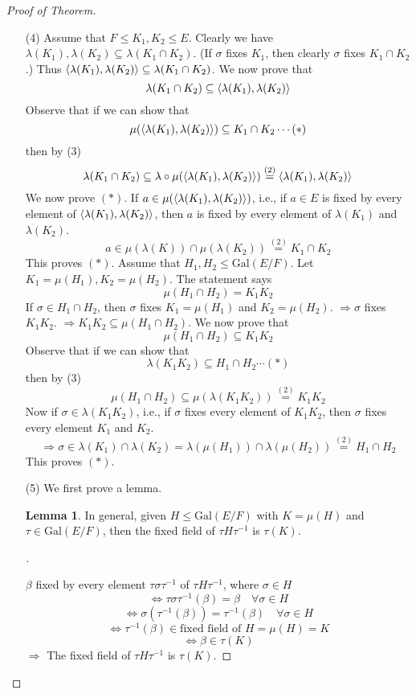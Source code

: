\documentclass{article}
\theoremstyle{definition}
\newtheorem{lem}{Lemma}
\newenvironment{proofs}[1][\proofname]{%
  \begin{proof}[#1]$ $\par\nobreak\ignorespaces
}{%
  \end{proof}
}
\newcommand{\Ra}{\Rightarrow}
\newcommand{\Lra}{\Leftrightarrow}
\begin{document}
\begin{proofs}[Proof of Theorem]
\begin{enumerate}
		\item[(4)] Assume that $F \leq K_1, K_2 \leq E$.
			Clearly we have $\lambda(K_1), \lambda(K_2) \subseteq \lambda(K_1 \cap K_2)$.
			(If $\sigma$ fixes $K_1$, then clearly $\sigma$ fixes $K_1 \cap K_2$.)
			Thus $\ev{\lambda(K_1), \lambda(K_2)} \subseteq \lambda(K_1 \cap K_2)$.
			We now prove that
			\[
				\lambda(K_1 \cap K_2) \subseteq \ev{\lambda(K_1), \lambda(K_2)}
			\]
			Observe that if we can show that
			\[
				\mu(\ev{\lambda(K_1), \lambda(K_2)}) \subseteq K_1 \cap K_2 \cdots (*)
			\]
			then by (3)
			\[
				\lambda(K_1 \cap K_2) \subseteq \lambda \circ \mu(\ev{\lambda(K_1), \lambda(K_2)}) \stackrel{(2)}{=} \ev{\lambda(K_1), \lambda(K_2)}
			\]
			We now prove $(*)$.
			If $a \in \mu(\ev{\lambda(K_1), \lambda(K_2)})$, i.e., if $a \in E$ is fixed by every element of $\ev{\lambda(K_1), \lambda(K_2)}$, then $a$ is fixed by every element of $\lambda(K_1)$ and $\lambda(K_2)$.
			\[
				a \in \mu(\lambda(K)) \cap \mu(\lambda(K_2)) \stackrel{(2)}{=} K_1 \cap K_2
			\]
			This proves $(*)$.
			Assume that $H_1, H_2 \leq \text{Gal}(E/F)$.
			Let $K_1 = \mu(H_1), K_2 = \mu(H_2)$.
			The statement says
			\[
				\mu(H_1 \cap H_2) = K_1 K_2
			\]
			If $\sigma \in H_1 \cap H_2$, then $\sigma$ fixes $K_1 = \mu(H_1)$ and $K_2 = \mu(H_2)$.
			$\Ra \sigma$ fixes $K_1 K_2$.
			$\Ra K_1 K_2 \subseteq \mu(H_1 \cap H_2)$.
			We now prove that
			\[
				\mu(H_1 \cap H_2) \subseteq K_1 K_2
			\]
			Observe that if we can show that
			\[
				\lambda(K_1 K_2) \subseteq H_1 \cap H_2 \cdots (*)
			\]
			then by (3)
			\[
				\mu(H_1 \cap H_2) \subseteq \mu(\lambda(K_1 K_2)) \stackrel{(2)}{=} K_1 K_2
			\]
			Now if $\sigma \in \lambda(K_1 K_2)$, i.e., if $\sigma$ fixes every element of $K_1 K_2$, then $\sigma$ fixes every element $K_1$ and $K_2$.
			\[
				\Ra \sigma \in \lambda(K_1) \cap \lambda(K_2) = \lambda(\mu(H_1)) \cap \lambda(\mu(H_2)) \stackrel{(2)}{=} H_1 \cap H_2
			\]
			This proves $(*)$.

		\item[(5)] We first prove a lemma.

			\begin{lem}
				In general, given $H \leq \text{Gal}(E/F)$ with $K = \mu(H)$ and $\tau \in \text{Gal}(E/F)$, then the fixed field of $\tau H \tau^{-1}$ is $\tau(K)$.
			\end{lem}

			\begin{proofs}
				$\beta$ fixed by every element $\tau \sigma \tau^{-1}$ of $\tau H \tau^{-1}$, where $\sigma \in H$
				\[
					\Lra \tau \sigma \tau^{-1}(\beta) = \beta \quad \forall \sigma \in H
				\]
				\[
					\Lra \sigma(\tau^{-1}(\beta)) = \tau^{-1}(\beta) \quad \forall \sigma \in H
				\]
				\[
					\Lra \tau^{-1}(\beta) \in \text{fixed field of }H = \mu(H) = K
				\]
				\[
					\Lra \beta \in \tau(K)
				\]
				$\Ra$ The fixed field of $\tau H \tau^{-1}$ is $\tau(K)$.
			\end{proofs}


\end{enumerate}
\end{proofs}
\end{document}
